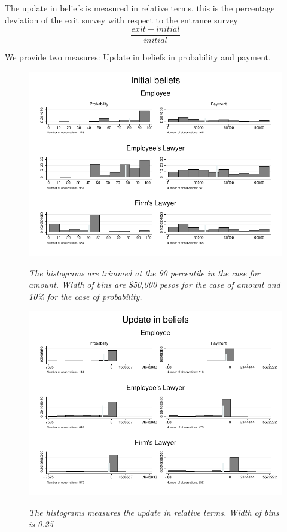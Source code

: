 \documentclass[12pt]{article}
\theoremstyle{named}
\newcommand{\folder}{./Effect}
\begin{document}
The update in beliefs is measured in relative terms, this is the percentage deviation of the exit survey with respect to the entrance survey
\[\frac{exit-initial}{initial}\]

 We provide two measures: Update in beliefs in probability and payment.\\

\begin{center}
\scriptsize{}
\end{center}



\begin{figure}[H]
\label{diff}
\begin{center}
\includegraphics[width=\textwidth]{./Figures/belief.pdf}
\end{center}
{\footnotesize \textit{The histograms are trimmed at the 90 percentile in the case for amount. Width of bins are \$50,000 pesos for the case of amount and 10\% for the case of probability.}}
\end{figure}


\begin{figure}[H]
\label{update}
\begin{center}
\includegraphics[width=\textwidth]{./Figures/update_belief.pdf}
\end{center}
{\footnotesize \textit{The histograms measures the update in relative terms. Width of bins is 0.25 }}
\end{figure}
\end{document}
